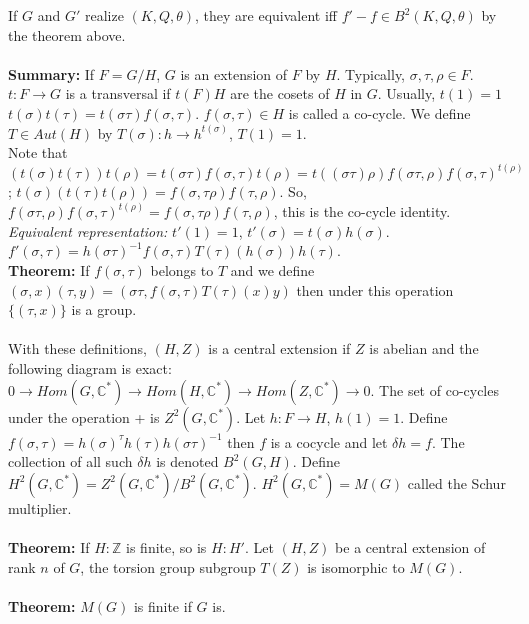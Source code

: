 If $G$ and $G'$ realize $(K, Q, \theta)$, they are equivalent iff $f' - f \in B^2(K, Q, \theta)$ by the theorem
above.
\\
\\
{\bf Summary:} If $F=G/H$, $G$ is an extension of $F$ by $H$.  Typically, $\sigma, \tau, \rho \in F$.
$t: F \rightarrow G$ is a transversal if $t(F)H$ are the cosets of $H$ in $G$.  Usually, $t(1)=1$
\\
$t(\sigma) t(\tau) = t(\sigma \tau) f(\sigma, \tau)$. $f(\sigma, \tau) \in H$ is called a co-cycle. We define
$T \in Aut(H)$ by $T(\sigma): h \rightarrow h^{t(\sigma)}$, $T(1)=1$.\\
Note that
$(t(\sigma) t(\tau)) t(\rho) = t(\sigma \tau) f(\sigma, \tau) t(\rho)=
t((\sigma \tau) \rho) f(\sigma \tau, \rho) f(\sigma, \tau)^{t(\rho)}$;
$t(\sigma) (t(\tau) t(\rho)) = f(\sigma, \tau \rho) f(\tau, \rho)$.  So,
$f(\sigma \tau, \rho) f(\sigma, \tau)^{t(\rho)}= f(\sigma, \tau \rho) f(\tau, \rho)$, this is the co-cycle identity.
\\
\emph{Equivalent representation:} $t'(1)=1$, $t'(\sigma)= t(\sigma) h(\sigma)$.
$f' (\sigma , \tau) = h(\sigma \tau)^{-1} f(\sigma, \tau) T(\tau)(h(\sigma)) h(\tau)$.
\\
{\bf Theorem:} If $f(\sigma, \tau)$ belongs to $T$ and we define
$(\sigma, x) (\tau, y)= (\sigma \tau, f(\sigma, \tau) T(\tau)(x)y)$ then under this operation $\{ (\tau, x) \}$
is a group.
\\
\\
With these definitions, $(H, Z)$ is a central extension if $Z$ is abelian and the following diagram is exact:
$0 \rightarrow Hom(G, {\mathbb C}^*) \rightarrow  Hom(H, {\mathbb C}^*) \rightarrow  Hom(Z, {\mathbb C}^*) \rightarrow  0$.
The set of co-cycles under the operation + is $Z^2(G, {\mathbb C}^*)$.
Let $h: F \rightarrow H$, $h(1)= 1$. Define $f(\sigma, \tau) = h(\sigma)^{\tau} h(\tau) h(\sigma \tau)^{-1}$ then $f$ is a
cocycle and let $\delta h= f$.  The collection of all such $\delta h$ is denoted $B^2(G, H)$.
Define $H^2(G, {\mathbb C}^*) = Z^2(G, {\mathbb C}^*)/B^2(G, {\mathbb C}^*)$.
$H^2(G, {\mathbb C}^*) = M(G)$ called the Schur multiplier.
\\
\\
{\bf Theorem:} If $H:{\mathbb Z}$ is finite, so is $H:H'$.  Let $(H, Z)$ be a central extension of rank $n$ of $G$,
the torsion group subgroup $T(Z)$ is isomorphic to $M(G)$.
\\
\\
{\bf Theorem:} $M(G)$ is finite if $G$ is.

